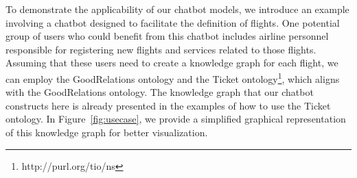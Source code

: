 \documentclass[runningheads]{llncs}
\begin{document}

To demonstrate the applicability of our chatbot models, we introduce an example involving a chatbot designed to facilitate the definition of flights. One potential group of users who could benefit from this chatbot includes airline personnel responsible for registering new flights and services related to those flights. Assuming that these users need to create a knowledge graph for each flight, we can employ the GoodRelations ontology\cite{hepp2008goodrelations} and the Ticket ontology\footnote{\label{Ticket Ontology}http://purl.org/tio/ns}, which aligns with the GoodRelations ontology. The knowledge graph that our chatbot constructs here is already presented in the examples of how to use the Ticket ontology. In Figure~\ref{fig:usecase}, we provide a simplified graphical representation of this knowledge graph for better visualization. 
\end{document}
